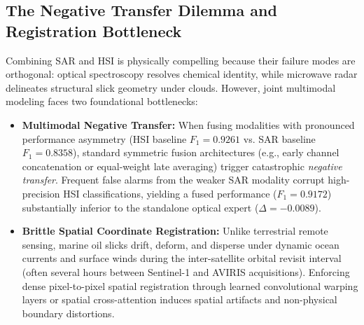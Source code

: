 \documentclass[conference]{IEEEtran}
\begin{document}
\subsection{The Negative Transfer Dilemma and Registration Bottleneck}
Combining SAR and HSI is physically compelling because their failure modes are orthogonal: optical spectroscopy resolves chemical identity, while microwave radar delineates structural slick geometry under clouds. However, joint multimodal modeling faces two foundational bottlenecks:
\begin{itemize}
    \item \textbf{Multimodal Negative Transfer:} When fusing modalities with pronounced performance asymmetry (HSI baseline $F_1 = 0.9261$ vs. SAR baseline $F_1 = 0.8358$), standard symmetric fusion architectures (e.g., early channel concatenation or equal-weight late averaging) trigger catastrophic \textit{negative transfer}. Frequent false alarms from the weaker SAR modality corrupt high-precision HSI classifications, yielding a fused performance ($F_1 = 0.9172$) substantially inferior to the standalone optical expert ($\Delta = -0.0089$).
    
    \item \textbf{Brittle Spatial Coordinate Registration:} Unlike terrestrial remote sensing, marine oil slicks drift, deform, and disperse under dynamic ocean currents and surface winds during the inter-satellite orbital revisit interval (often several hours between Sentinel-1 and AVIRIS acquisitions). Enforcing dense pixel-to-pixel spatial registration through learned convolutional warping layers or spatial cross-attention induces spatial artifacts and non-physical boundary distortions.
\end{itemize}
\end{document}

